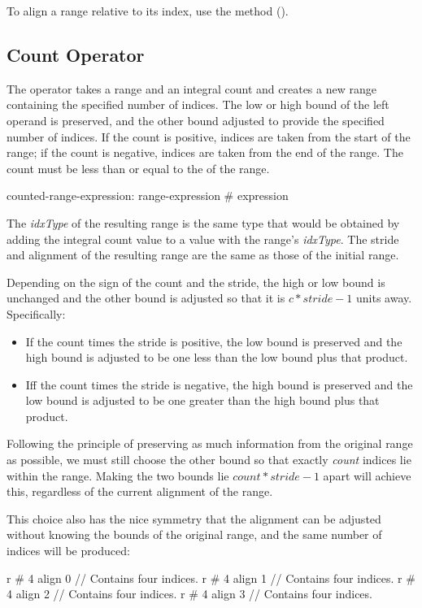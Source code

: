 To align a range relative to its  index, use
the  method ().


\subsection{Count Operator}
\label{Count_Operator}

The \chpl{#} operator takes a range and an integral count and creates a new
range containing the specified number of indices.  The low or high bound of the
left operand is preserved, and the other bound adjusted to provide the specified
number of indices.  If the count is positive, indices are taken from the start
of the range; if the count is negative, indices are taken from the end of the
range.  The count must be less than or equal to the  of the range.

\begin{syntax}
counted-range-expression:
  range-expression # expression
\end{syntax}

The \emph{idxType} of the resulting range is the same type that would be
obtained by adding the integral count value to a value with the
range's \emph{idxType}.  
The stride and alignment of the resulting range are the same as those
of the initial range.  

Depending on the sign of the count and the stride, the high or low bound is
unchanged and the other bound is adjusted so that it is $c * stride - 1$ units
away.  Specifically:
\begin{itemize}
\item If the count times the stride is positive, the low bound is preserved
and the high bound is adjusted to be one less than the low bound plus that
product.
\item Iff the count times the stride is negative, the high bound is preserved
and the low bound is adjusted to be one greater than the high bound plus that
product.
\end{itemize}

\begin{rationale}
Following the principle of preserving as much information from the original
range as possible, we must still choose the other bound so that
exactly \emph{count} indices lie within the range.  Making the two bounds lie
$count * stride - 1$ apart will achieve this, regardless of the current
alignment of the range.

This choice also has the nice symmetry that the alignment can be adjusted
without knowing the bounds of the original range, and the same number of indices
will be produced:
\begin{chapel}
r # 4 align 0   // Contains four indices.
r # 4 align 1   // Contains four indices.
r # 4 align 2   // Contains four indices.
r # 4 align 3   // Contains four indices.
\end{chapel}
\end{rationale}

